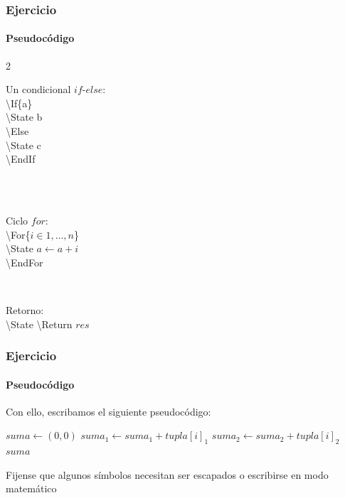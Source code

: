 \begin{frame}
\frametitle{Ejercicio}
\framesubtitle{Pseudocódigo}


\begin{multicols}{2}

\colorbox{color2}{Un condicional $if$-$else$:} \\

\textbackslash If\{a\} \\
\hspace*{15pt} \textbackslash State b \\
\textbackslash Else \\
\hspace*{15pt} \textbackslash State c \\
\textbackslash EndIf \\

\

\

\colorbox{color2}{Ciclo $for$:} \\

\textbackslash For\{$i \in 1,\ldots,n$\} \\
\hspace*{15pt} \textbackslash State $a \gets a + i$ \\
\textbackslash EndFor

\

\colorbox{color2}{Retorno:} \\

\textbackslash State \textbackslash Return $res$ \\


\end{multicols}
\end{frame}

\begin{frame}
\frametitle{Ejercicio}
\framesubtitle{Pseudocódigo}

Con ello, escribamos el siguiente pseudocódigo:

\begin{tcolorbox}[colframe=color1]
\begin{center}
\begin{algorithmic}
        \State $suma \gets (0,0)$
            \State $suma_1 \gets suma_1 + tupla[i]_1$
            \State $suma_2 \gets suma_2 + tupla[i]_2$
        \EndFor
        \EndIf
        \State \Return $suma$
    \EndFunction
\end{algorithmic}
\end{center}
\end{tcolorbox}

Fijense que algunos símbolos necesitan ser escapados o escribirse en modo matemático

\end{frame}
